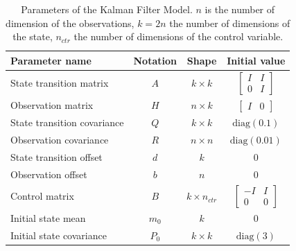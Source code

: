 \documentclass{article}
\begin{document}
\begin{table}[H]
\caption{Parameters of the Kalman Filter Model. $n$ is the number of dimension of the observations, $k = 2n$ the number of dimensions of the state, $n_{ctr}$ the number of dimensions of the control variable.}
\label{table:parameters}
\vspace{5pt}
\centering
\begin{tabular}{l c c c}
\toprule
    \bfseries Parameter name & \bfseries Notation & \bfseries Shape & \bfseries Initial value\\
    \hline
    \noalign{\vspace{4pt}}
    State transition matrix & $A$ & $k \times k$ & $\begin{bmatrix}I & I \\ 0 & I\end{bmatrix}$ \\
    \noalign{\vspace{4pt}}
    Observation matrix & $H$ & $n \times k$ & $\begin{bmatrix}I & 0 \end{bmatrix}$ \\
    \noalign{\vspace{4pt}}
    State transition covariance & $Q$ & $k \times k$ & $\text{diag}(0.1)$ \\
    \noalign{\vspace{4pt}}
    Observation covariance & $R$ & $n \times n$ & $\text{diag}(0.01)$\\
    \noalign{\vspace{4pt}}
    State transition offset & $d$ & $k$ & 0 \\
    \noalign{\vspace{4pt}}
    Observation offset & $b$ & $n$ & 0 \\
    \noalign{\vspace{4pt}}
    Control matrix & $B$ & $k \times n_{ctr}$ & $\begin{bmatrix} -I & I \\ 0 & 0 \end{bmatrix}$ \\
    \noalign{\vspace{4pt}}
    Initial state mean & $m_0$ & $k$ & $0$ \\
    \noalign{\vspace{4pt}}
    Initial state covariance & $P_0$ & $k \times k$ & $\text{diag}(3)$ \\
\bottomrule
\end{tabular}
\end{table}
\end{document}
